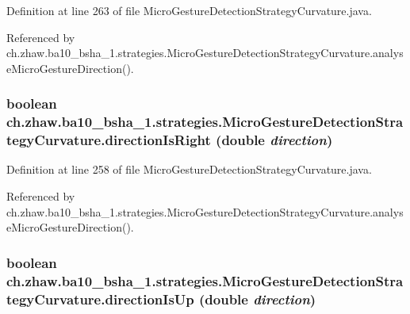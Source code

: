 Definition at line 263 of file MicroGestureDetectionStrategyCurvature.java.

Referenced by ch.zhaw.ba10\_\-bsha\_\-1.strategies.MicroGestureDetectionStrategyCurvature.analyseMicroGestureDirection().\hypertarget{classch_1_1zhaw_1_1ba10__bsha__1_1_1strategies_1_1MicroGestureDetectionStrategyCurvature_a0e5c080758fc29ddf572ed02f9c749ae}{
\subsubsection[{directionIsRight}]{\setlength{\rightskip}{0pt plus 5cm}boolean ch.zhaw.ba10\_\-bsha\_\-1.strategies.MicroGestureDetectionStrategyCurvature.directionIsRight (double {\em direction})}}
\label{classch_1_1zhaw_1_1ba10__bsha__1_1_1strategies_1_1MicroGestureDetectionStrategyCurvature_a0e5c080758fc29ddf572ed02f9c749ae}


Definition at line 258 of file MicroGestureDetectionStrategyCurvature.java.

Referenced by ch.zhaw.ba10\_\-bsha\_\-1.strategies.MicroGestureDetectionStrategyCurvature.analyseMicroGestureDirection().\hypertarget{classch_1_1zhaw_1_1ba10__bsha__1_1_1strategies_1_1MicroGestureDetectionStrategyCurvature_acabafe95c89e97cd87488d70ed074adb}{
\subsubsection[{directionIsUp}]{\setlength{\rightskip}{0pt plus 5cm}boolean ch.zhaw.ba10\_\-bsha\_\-1.strategies.MicroGestureDetectionStrategyCurvature.directionIsUp (double {\em direction})}}
\label{classch_1_1zhaw_1_1ba10__bsha__1_1_1strategies_1_1MicroGestureDetectionStrategyCurvature_acabafe95c89e97cd87488d70ed074adb}


